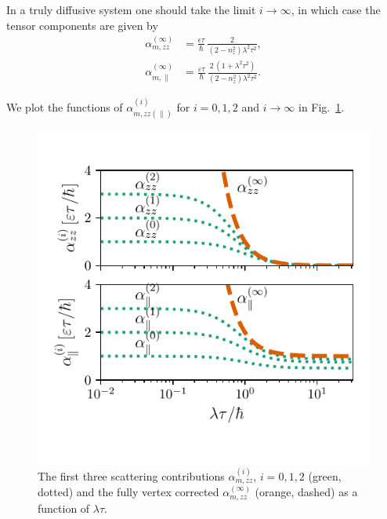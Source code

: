 In a truly diffusive system one should take the limit $i\rightarrow\infty$, in which case the tensor components are given by
\begin{align}
\label{eq:alphaparallelzerodelta}
    \alpha_{m,zz}^{(\infty)} &= \frac{\epsilon \tau}{\hbar}\, \frac{2}{(2-n_z^2)\lambda^2\tau^2},\\
    \alpha_{m,\parallel}^{(\infty)} &= \frac{\varepsilon\tau}{\hbar}\,\frac{2\,(1+\lambda^2\tau^2)}{(2-n_z^2)\lambda^2\tau^2}.
\end{align}

We plot the functions of $\alpha_{m,zz(\parallel)}^{(i)}$ for $i=0,1,2$ and $i\rightarrow\infty$ in Fig.~\ref{fig:alpha_plot}. 
\begin{figure}
    \centering
    \includegraphics[width=\linewidth]{gfx/Chapter04/alpha_plot2}
    \caption{The first three scattering contributions $\alpha_{m,zz}^{(i)}$, $i=0,1,2$ (green, dotted) and the fully vertex corrected $\alpha_{m,zz}^{(\infty)}$ (orange, dashed) as a function of $\lambda \tau$. }
    \label{fig:alpha_plot}
\end{figure}

